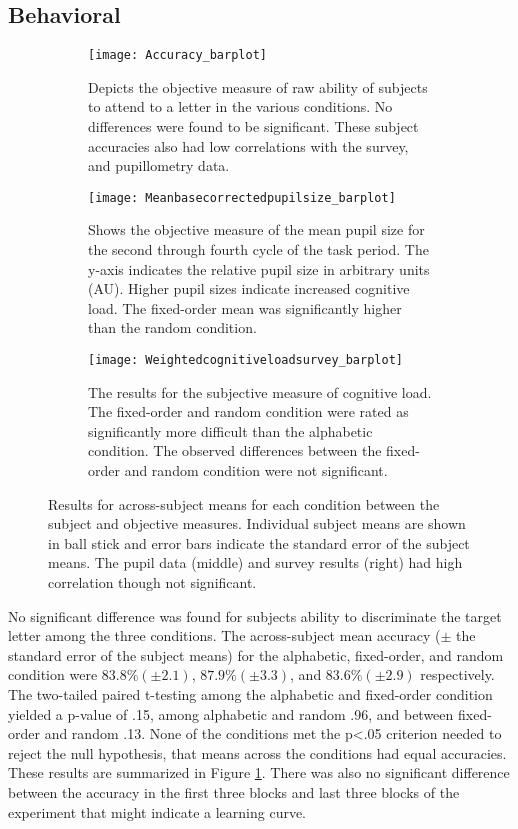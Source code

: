 \documentclass[10pt]{article}
\begin{document}
\subsection{Behavioral}

\begin{figure}[t]
    \centering
    \begin{subfigure}[t]{.25\linewidth}
        \centering
      \texttt{[image: Accuracy\_barplot]}
      \caption{Depicts the objective measure of raw ability of
      subjects to attend to a letter in the various
  conditions.  No differences were found to be significant.
  These subject accuracies also had low correlations with the
  survey, and pupillometry data.}
      \label{accuracy}
    \end{subfigure}
    \qquad
    \begin{subfigure}[t]{.25\linewidth}
      \centering
      \texttt{[image: Meanbasecorrectedpupilsize\_barplot]}
      \caption{Shows the objective measure of the mean pupil size for the second
      through fourth cycle of the task period. The y-axis indicates the
      relative pupil size in arbitrary units (AU). Higher pupil
      sizes indicate increased cognitive load.  The fixed-order
      mean was significantly higher than the random condition.} 
      \label{psBarplot}
    \end{subfigure}
    \qquad
    \begin{subfigure}[t]{.25\linewidth}
      \centering
      \texttt{[image: Weightedcognitiveloadsurvey\_barplot]}
      \caption{The results for the subjective measure of cognitive
  load.  The fixed-order and random condition were rated
  as significantly more difficult than the alphabetic
  condition. The observed differences between the fixed-order
  and random condition were not significant.}
      \label{cogLoad}
    \end{subfigure}
  \caption{Results for across-subject means for each condition
      between the subject and objective measures. Individual
  subject means are shown in ball stick and error bars
  indicate the standard error of the subject means.  The pupil
  data (middle) and survey results (right) had high
  correlation though not significant.}
\end{figure}

No significant difference was found for subjects ability to
discriminate the target letter among the three conditions.
The across-subject mean accuracy ($\pm$ the standard error of
the subject means) for the alphabetic, fixed-order, and random
condition were $83.8 \% (\pm2.1)$, $87.9 \% (\pm3.3)$,
and $83.6 \% (\pm 2.9)$ respectively.  The two-tailed paired t-testing among 
the alphabetic and fixed-order condition yielded a p-value of .15,
among alphabetic and random .96, and between fixed-order and
random .13.  None of the conditions met the p<.05 criterion needed
to reject the null hypothesis, that means across the conditions had
equal accuracies. These results are summarized in Figure \ref{accuracy}.
There was also no significant difference between the accuracy
in the first three blocks and last three blocks of the
experiment that might indicate a learning curve.
\end{document}
